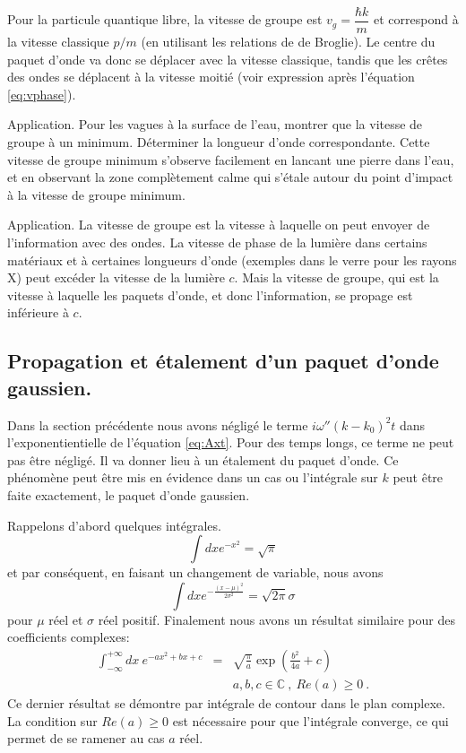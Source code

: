 \documentclass{book}
\begin{document}
Pour la particule quantique libre, la vitesse de groupe est 
$v_g = \dfrac{\hbar k}{m}$ et correspond à la vitesse classique $p/m$ (en utilisant les relations de de Broglie). Le centre du paquet d'onde va donc se déplacer avec la vitesse classique, tandis que les crêtes des ondes se déplacent à la vitesse moitié (voir expression après l'équation \eqref{eq:vphase}).

Application. Pour les vagues à la surface de l'eau, montrer que la vitesse de groupe à un minimum. Déterminer la longueur d'onde correspondante. Cette vitesse de groupe minimum s'observe facilement en lancant une pierre dans l'eau, et en observant la zone complètement calme qui s'étale autour du point d'impact à la vitesse de groupe minimum.

Application. La vitesse de groupe est la vitesse à laquelle on peut envoyer de l'information avec des ondes. La vitesse de phase de la lumière dans certains matériaux et à certaines longueurs d'onde (exemples dans le verre pour les rayons X) peut excéder la vitesse de la lumière $c$. Mais la vitesse de groupe, qui est la vitesse à laquelle les paquets d'onde, et donc l'information, se propage est inférieure à $c$.


\subsection{Propagation et étalement d'un paquet d'onde gaussien.}

Dans la section précédente nous avons négligé le terme $i\omega'' (k-k_0)^2 t$ dans l'exponentientielle de l'équation \eqref{eq:Axt}. Pour des temps longs, ce terme ne peut pas être négligé. Il va donner lieu à un étalement du paquet d'onde. Ce phénomène peut être mis en évidence dans un cas ou l'intégrale sur $k$ peut  être faite exactement, le paquet d'onde gaussien.

Rappelons d'abord quelques intégrales.
\begin{equation}
\int dx e^{-x^2} = \sqrt{\pi}
\end{equation}
et par conséquent, en faisant un changement de variable, nous avons
\begin{equation}
\int dx e^{-\frac{(x-\mu)^2}{2 \sigma^2}} = \sqrt{2\pi}\sigma
\end{equation}
pour $\mu$ réel et $\sigma$ réel positif.
Finalement nous avons un résultat similaire pour des coefficients complexes:
\begin{eqnarray}
\int_{- \infty}^{+\infty} dx\ e^{-ax^2 +bx +c}&=& \sqrt{\frac{\pi}{a}} \exp (\frac{b^2}{4a} + c)\nonumber\\
& & a,b,c\in \mathbb{C}\ , \ Re(a)\geq 0\ .
\label{eq:gaussianInt}
\end{eqnarray}
Ce dernier résultat se démontre par intégrale de contour dans le plan complexe. La condition sur $Re(a)\geq 0$ est nécessaire pour que l'intégrale converge, ce qui permet de se ramener au cas $a$ réel.
\end{document}
